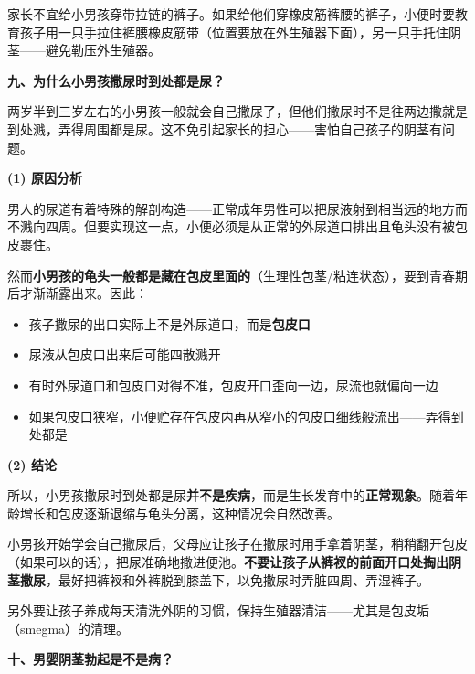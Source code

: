 \documentclass[12pt,a4paper,twoside]{ctexbook}
\begin{document}
\begin{tcolorbox}[colback=pink!5!white,colframe=red!50!black,title=贴心小叮咛]
家长不宜给小男孩穿带拉链的裤子。如果给他们穿橡皮筋裤腰的裤子，小便时要教育孩子用一只手拉住裤腰橡皮筋带（位置要放在外生殖器下面），另一只手托住阴茎——避免勒压外生殖器。
\end{tcolorbox}

\vspace{0.8em}
\noindent\textbf{九、为什么小男孩撒尿时到处都是尿？}

两岁半到三岁左右的小男孩一般就会自己撒尿了，但他们撒尿时不是往两边撒就是到处溅，弄得周围都是尿。这不免引起家长的担心——害怕自己孩子的阴茎有问题。

\vspace{0.5em}
\noindent\textbf{(1) 原因分析}

男人的尿道有着特殊的解剖构造——正常成年男性可以把尿液射到相当远的地方而不溅向四周。但要实现这一点，小便必须是从正常的外尿道口排出且龟头没有被包皮裹住。

然而\textbf{小男孩的龟头一般都是藏在包皮里面的}（生理性包茎/粘连状态），要到青春期后才渐渐露出来。因此：
\begin{itemize}
	\item 孩子撒尿的出口实际上不是外尿道口，而是\textbf{包皮口}
	\item 尿液从包皮口出来后可能四散溅开
	\item 有时外尿道口和包皮口对得不准，包皮开口歪向一边，尿流也就偏向一边
	\item 如果包皮口狭窄，小便贮存在包皮内再从窄小的包皮口细线般流出——弄得到处都是
\end{itemize}

\vspace{0.3em}
\noindent\textbf{(2) 结论}

所以，小男孩撒尿时到处都是尿\textbf{并不是疾病}，而是生长发育中的\textbf{正常现象}。随着年龄增长和包皮逐渐退缩与龟头分离，这种情况会自然改善。

\begin{tcolorbox}[colback=pink!5!white,colframe=red!50!black,title=贴心小叮咛]
小男孩开始学会自己撒尿后，父母应让孩子在撒尿时用手拿着阴茎，稍稍翻开包皮（如果可以的话），把尿准确地撒进便池。\textbf{不要让孩子从裤衩的前面开口处掏出阴茎撒尿}，最好把裤衩和外裤脱到膝盖下，以免撒尿时弄脏四周、弄湿裤子。

另外要让孩子养成每天清洗外阴的习惯，保持生殖器清洁——尤其是包皮垢（smegma）的清理。
\end{tcolorbox}

\vspace{0.8em}
\noindent\textbf{十、男婴阴茎勃起是不是病？}
\end{document}
